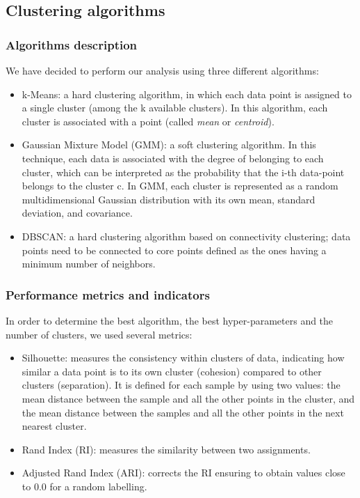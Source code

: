 \documentclass[acmlarge,nonacm]{acmart}
\begin{document}
\subsection{Clustering algorithms}
\subsubsection{Algorithms description}
We have decided to perform our analysis using three different algorithms:
\begin{itemize}
    \item k-Means: a hard clustering algorithm, in which each data point is assigned to a single cluster (among the k available clusters). In this algorithm, each cluster is associated with a point (called \emph{mean} or \emph{centroid}).
    \item Gaussian Mixture Model (GMM): a soft clustering algorithm. In this technique, each data is associated with the degree of belonging to each cluster, which can be interpreted as the probability that the i-th data-point belongs to the cluster c. In GMM, each cluster is represented as a random multidimensional Gaussian distribution with its own mean, standard deviation, and covariance. 
    \item DBSCAN: a hard clustering algorithm based on connectivity clustering; data points need to be connected to core points defined as the ones having a minimum number of neighbors.
\end{itemize}

\subsubsection{Performance metrics and indicators}
In order to determine the best algorithm, the best hyper-parameters and the number of clusters, we used several metrics:
\begin{itemize}
    \item Silhouette: measures the consistency within clusters of data, indicating how similar a data point is to its own cluster (cohesion) compared to other clusters (separation). It is defined for each sample by using two values: the mean distance between the sample and all the other points in the cluster, and the mean distance between the samples and all the other points in the next nearest cluster.
    \item Rand Index (RI): measures the similarity between two assignments.
    \item Adjusted Rand Index (ARI): corrects the RI ensuring to obtain values close to 0.0 for a random labelling.
\end{itemize}
\end{document}
